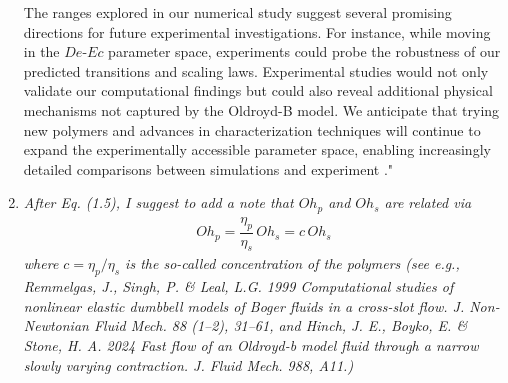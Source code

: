 \documentclass[]{article}
\newcommand{\AKD}[1]{{\textcolor{magenta}{#1}}}
\newcommand{\vsy}[1]{\todo[color=orange, bordercolor=none, textcolor=white]{Vatsal}\textcolor{orange}{#1}}
\newcommand{\bb}{\color{black} \normalfont}
\begin{document}
\begin{enumerate}
The ranges explored in our numerical study suggest several promising directions for future experimental investigations. For instance, while moving in the $De$-$Ec$ parameter space, experiments could probe the robustness of our predicted transitions and scaling laws. Experimental studies would not only validate our computational findings but could also reveal additional physical mechanisms not captured by the Oldroyd-B model. We anticipate that trying new polymers and advances in characterization techniques \citep{gaillard2024beware} will continue to expand the experimentally accessible parameter space, enabling increasingly detailed comparisons between simulations and experiment\bb."
%
%
%

\item \textit{After Eq. (1.5), I suggest to add a note that $Oh_p$ and $Oh_s$ are related via
\begin{align}
    Oh_p = \dfrac{\eta_p}{\eta_s} \, Oh_s = c\,Oh_s
\end{align}
where $c = \eta_p/\eta_s$ is the so-called concentration of the polymers (see e.g., Remmelgas,
J., Singh, P. \& Leal, L.G. 1999 Computational studies of nonlinear elastic dumbbell models of Boger fluids in a cross-slot flow. J. Non-Newtonian Fluid Mech. 88 (1–2), 31–61, and Hinch, J. E., Boyko, E. \& Stone, H. A. 2024 Fast flow of an Oldroyd-b model fluid through a narrow slowly varying contraction. J. Fluid Mech. 988, A11.)
}


\end{enumerate}
\end{document}
